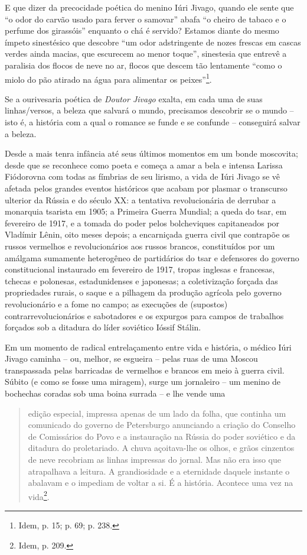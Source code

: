 E que dizer da precocidade poética do menino Iúri Jivago, quando ele
sente que ``o odor do carvão usado para ferver o samovar'' abafa ``o
cheiro de tabaco e o perfume dos girassóis'' enquanto o chá é servido?
Estamos diante do mesmo ímpeto sinestésico que descobre ``um odor
adstringente de nozes frescas em cascas verdes ainda macias, que
escurecem ao menor toque'', sinestesia que entrevê a paralisia dos
flocos de neve no ar, flocos que descem tão lentamente ``como o miolo do
pão atirado na água para alimentar os peixes''\footnote{Idem, p. 15; p.
  69; p. 238.}.

Se a ourivesaria poética de \emph{Doutor Jivago} exalta, em cada uma de
suas linhas/versos, a beleza que salvará o mundo, precisamos descobrir
se o mundo -- isto é, a história com a qual o romance se funde e se
confunde -- conseguirá salvar a beleza.

Desde a mais tenra infância até seus últimos momentos em um bonde
moscovita; desde que se reconhece como poeta e começa a amar a bela e
intensa Larissa Fiódorovna com todas as fímbrias de seu lirismo, a vida
de Iúri Jivago se vê afetada pelos grandes eventos históricos que acabam
por plasmar o transcurso ulterior da Rússia e do século XX: a tentativa
revolucionária de derrubar a monarquia tsarista em 1905; a Primeira
Guerra Mundial; a queda do tsar, em fevereiro de 1917, e a tomada do
poder pelos bolcheviques capitaneados por Vladímir Lênin, oito meses
depois; a encarniçada guerra civil que contrapõe os russos vermelhos e
revolucionários aos russos brancos, constituídos por um amálgama
sumamente heterogêneo de partidários do tsar e defensores do governo
constitucional instaurado em fevereiro de 1917, tropas inglesas e
francesas, tchecas e polonesas, estadunidenses e japonesas; a
coletivização forçada das propriedades rurais, o saque e a pilhagem da
produção agrícola pelo governo revolucionário e a fome no campo; as
execuções de (supostos) contrarrevolucionários e sabotadores e os
expurgos para campos de trabalhos forçados sob a ditadura do líder
soviético Ióssif Stálin.

Em um momento de radical entrelaçamento entre vida e história, o médico
Iúri Jivago caminha -- ou, melhor, se esgueira -- pelas ruas de uma
Moscou transpassada pelas barricadas de vermelhos e brancos em meio à
guerra civil. Súbito (e como se fosse uma miragem), surge um jornaleiro
-- um menino de bochechas coradas sob uma boina surrada -- e lhe vende
uma

\begin{quote}
edição especial, impressa apenas de um lado da folha, que continha um
comunicado do governo de Petersburgo anunciando a criação do Conselho de
Comissários do Povo e a instauração na Rússia do poder soviético e da
ditadura do proletariado. A chuva açoitava-lhe os olhos, e grãos
cinzentos de neve recobriam as linhas impressas do jornal. Mas não era
isso que atrapalhava a leitura. A grandiosidade e a eternidade daquele
instante o abalavam e o impediam de voltar a si. É a história. Acontece
uma vez na vida\footnote{Idem, p. 209.}.
\end{quote}

